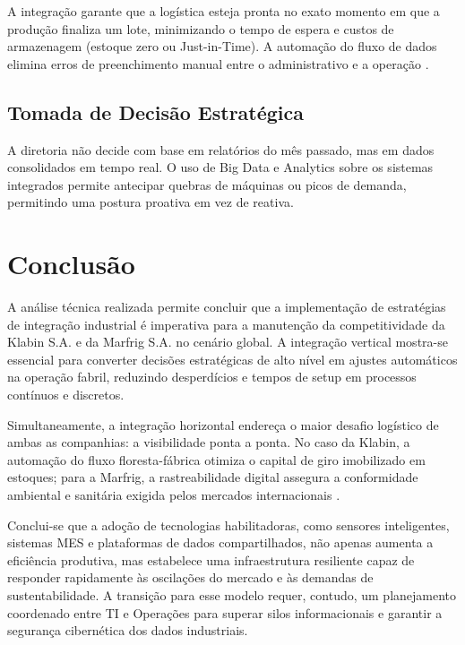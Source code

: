 \documentclass[12pt,a4paper,oneside]{article}
\begin{document}
A integração garante que a logística esteja pronta no exato momento em que a produção finaliza um lote, minimizando o tempo de espera e custos de armazenagem (estoque zero ou Just-in-Time). A automação do fluxo de dados elimina erros de preenchimento manual entre o administrativo e a operação \cite{cardoso2021}.

\subsection{Tomada de Decisão Estratégica}

A diretoria não decide com base em relatórios do mês passado, mas em dados consolidados em tempo real. O uso de Big Data e Analytics sobre os sistemas integrados permite antecipar quebras de máquinas ou picos de demanda, permitindo uma postura proativa em vez de reativa.

\section{Conclusão}

A análise técnica realizada permite concluir que a implementação de estratégias de integração industrial é imperativa para a manutenção da competitividade da Klabin S.A. e da Marfrig S.A. no cenário global. A integração vertical mostra-se essencial para converter decisões estratégicas de alto nível em ajustes automáticos na operação fabril, reduzindo desperdícios e tempos de setup em processos contínuos e discretos.

Simultaneamente, a integração horizontal endereça o maior desafio logístico de ambas as companhias: a visibilidade ponta a ponta. No caso da Klabin, a automação do fluxo floresta-fábrica otimiza o capital de giro imobilizado em estoques; para a Marfrig, a rastreabilidade digital assegura a conformidade ambiental e sanitária exigida pelos mercados internacionais \cite{schwab2016}.

Conclui-se que a adoção de tecnologias habilitadoras, como sensores inteligentes, sistemas MES e plataformas de dados compartilhados, não apenas aumenta a eficiência produtiva, mas estabelece uma infraestrutura resiliente capaz de responder rapidamente às oscilações do mercado e às demandas de sustentabilidade. A transição para esse modelo requer, contudo, um planejamento coordenado entre TI e Operações para superar silos informacionais e garantir a segurança cibernética dos dados industriais.



\end{document}
